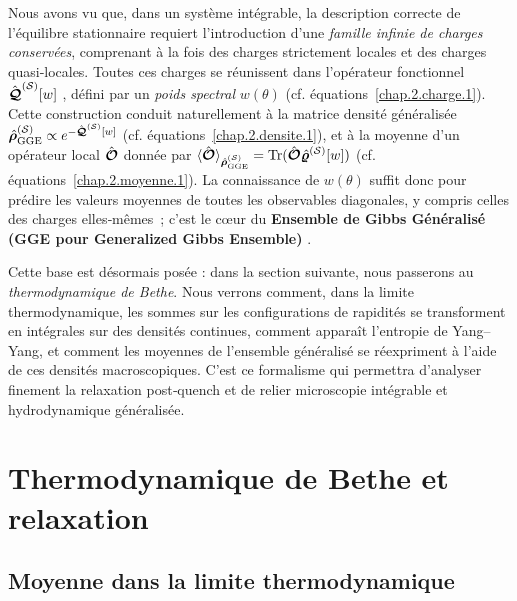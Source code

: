 Nous avons vu que, dans un système intégrable, la description correcte de l’équilibre stationnaire requiert l’introduction d’une \emph{famille infinie de charges conservées}, comprenant à la fois des charges strictement locales et des charges quasi‑locales.
Toutes ces charges se réunissent dans l’opérateur fonctionnel
\(
\hat{\bm{\mathcal{Q}}}^{(\mathcal{S})}[w]
\)
, défini par un \emph{poids spectral}  $w(\theta)$ (cf. équations~\eqref{chap.2.charge.1}).
Cette construction conduit naturellement à la matrice densité généralisée
\(
\hat{\bm{\rho}}^{(\mathcal{S})}_{\mathrm{GGE}}  \propto  e^{-\hat{\bm{\mathcal{Q}}}^{(\mathcal{S})}[w]}
\) 
(cf. équations~\eqref{chap.2.densite.1}), et à la moyenne d’un opérateur local $\hat{\bm{\mathcal{O}}}$ donnée par
\(
\langle \hat{\bm{\mathcal{O}}}\rangle_{\hat{\bm{\rho}}^{(\mathcal{S})}_{\mathrm{GGE}}}  =  \displaystyle  \text{Tr} (\hat{\bm{\mathcal{O}}}\hat{\bm{\varrho}}^{(\mathcal{S})}[w])
\)
(cf. équations~\eqref{chap.2.moyenne.1}).
La connaissance de $w(\theta)$ suffit donc pour prédire les valeurs moyennes de toutes les observables diagonales, y compris celles des charges elles‑mêmes ; c’est le cœur du {\bf Ensemble de Gibbs Généralisé (GGE pour Generalized Gibbs Ensemble)} .

\medskip
Cette base est désormais posée : dans la section suivante, nous passerons au \emph{thermodynamique de Bethe}.
Nous verrons comment, dans la limite thermodynamique, les sommes sur les configurations de rapidités se transforment en intégrales sur des densités continues, comment apparaît l’entropie de Yang–Yang, et comment les moyennes de l’ensemble généralisé se réexpriment à l’aide de ces densités macroscopiques.
C’est ce formalisme qui permettra d’analyser finement la relaxation post‑quench et de relier microscopie intégrable et hydrodynamique généralisée.



%

\section{Thermodynamique de Bethe et relaxation}

\subsection{Moyenne dans la limite thermodynamique}

